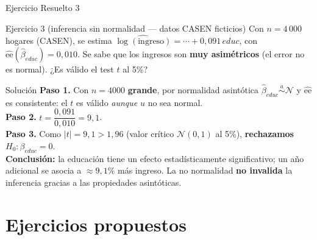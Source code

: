 \documentclass{beamer}
\begin{document}
\begin{frame}{Ejercicio Resuelto 3}

\begin{block}{Ejercicio 3 (inferencia sin normalidad — datos CASEN ficticios)}
Con $n=4\,000$ hogares (CASEN), se estima $\widehat{\log(\text{ingreso})} = \cdots + 0{,}091\,educ$, con $\widehat{\text{ee}}(\hat{\beta}_{educ})=0{,}010$. Se sabe que los ingresos son \textbf{muy asimétricos} (el error no es normal). ¿Es válido el test $t$ al 5\%?
\end{block}

\pause

\begin{exampleblock}{Solución}
\textbf{Paso 1.} Con $n=4000$ \textbf{grande}, por normalidad asintótica $\hat{\beta}_{educ}\overset{a}{\sim}\mathcal{N}$ y $\widehat{\text{ee}}$ es consistente: el $t$ es válido \emph{aunque} $u$ no sea normal. \\[2pt]
\textbf{Paso 2.} $t = \dfrac{0{,}091}{0{,}010} = 9{,}1$. \\[2pt]
\textbf{Paso 3.} Como $|t|=9{,}1 > 1{,}96$ (valor crítico $\mathcal{N}(0,1)$ al 5\%), \textbf{rechazamos} $H_0:\beta_{educ}=0$. \\[2pt]
\textbf{Conclusión:} la educación tiene un efecto estadísticamente significativo; un año adicional se asocia a $\approx 9{,}1\%$ más ingreso. La no normalidad \textbf{no invalida} la inferencia gracias a las propiedades asintóticas.
\end{exampleblock}

\end{frame}

\section{Ejercicios propuestos}
\end{document}
